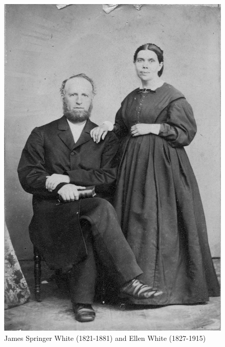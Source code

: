 \begin{figure}[hp]
    \centering
    \includegraphics[width=1\linewidth]{images/james-and-ellen-white.jpg}
    \caption*{James Springer White (1821-1881) and Ellen White (1827-1915)}
    \label{fig:james-and-ellen-white}
\end{figure}


